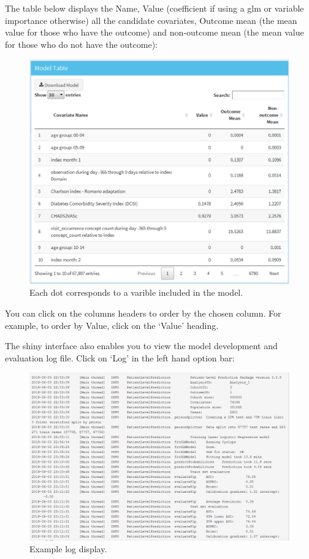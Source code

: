 \documentclass[11pt]{book}
\theoremstyle{definition}
\theoremstyle{definition}
\theoremstyle{definition}
\theoremstyle{remark}
\begin{document}
The table below displays the Name, Value (coefficient if using a glm or variable importance otherwise) all the candidate covariates, Outcome mean (the mean value for those who have the outcome) and non-outcome mean (the mean value for those who do not have the outcome):

\begin{figure}

{\centering \includegraphics[width=0.8\linewidth]{images/PatientLevelPrediction/shiny/shinyModelTable} 

}

\caption{Each dot corresponds to a varible included in the model.}\label{fig:shinyModelTable}
\end{figure}

You can click on the columns headers to order by the chosen column. For example, to order by Value, click on the `Value' heading.

The shiny interface also enables you to view the model development and evaluation log file. Click on `Log' in the left hand option bar:

\begin{figure}

{\centering \includegraphics[width=0.8\linewidth]{images/PatientLevelPrediction/shiny/shinyLog} 

}

\caption{Example log display.}\label{fig:shinyLog}
\end{figure}
\end{document}
